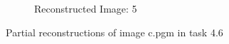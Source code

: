 \documentclass[12pt]{article}
\begin{document}
\begin{figure}
\begin{subfigure}[b]{0.20\textwidth}
		\caption{Reconstructed Image: 5}
	\end{subfigure}\quad
	\caption[Plots of partial reconstructions of image c.pgm in task 4.6]{\label{fig:task4.6ReconstructedImages} Partial reconstructions of image c.pgm in task 4.6}
\end{figure}
\end{document}
